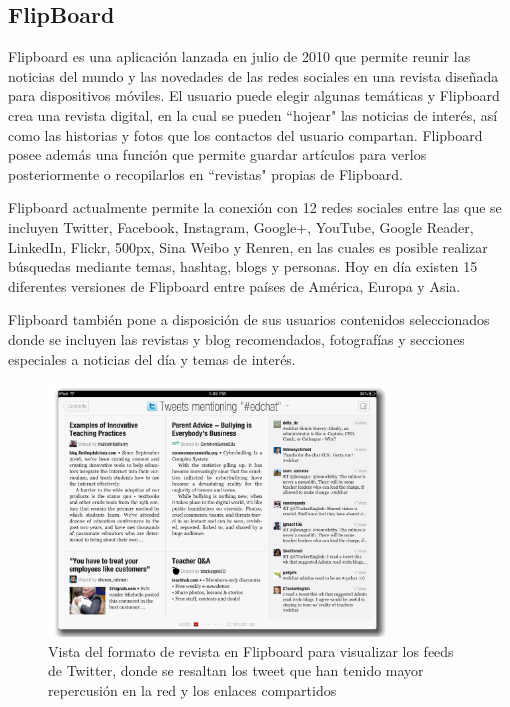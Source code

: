 \subsection{FlipBoard}

Flipboard \cite{flipboard} es una aplicación lanzada en julio de 2010 que permite reunir las noticias del mundo y las novedades de las redes sociales en una revista diseñada para dispositivos móviles. El usuario puede elegir algunas temáticas y Flipboard crea una revista digital, en la cual se pueden ``hojear" las noticias de interés, así como las historias y fotos que los contactos del usuario compartan. Flipboard posee además una función que permite guardar artículos para verlos posteriormente o recopilarlos en ``revistas" propias de Flipboard.


Flipboard actualmente permite la conexión con 12 redes sociales entre las que se incluyen Twitter, Facebook, Instagram, Google+, YouTube, Google Reader, LinkedIn, Flickr, 500px, Sina Weibo y Renren, en las cuales es posible realizar búsquedas mediante temas, hashtag, blogs y personas. Hoy en día existen 15 diferentes versiones de Flipboard entre países de América, Europa y Asia.

Flipboard también pone a disposición de sus usuarios contenidos seleccionados donde se incluyen las revistas y blog recomendados, fotografías y secciones especiales a noticias del día y temas de interés.

\begin{figure}[H]
	\centering
	\includegraphics[width=0.8\textwidth]{imgs/flipboard3.PNG}
	\caption{Vista del formato de revista en Flipboard para visualizar los feeds de Twitter, donde se resaltan los tweet que han tenido mayor repercusión en la red y los enlaces compartidos}
	\label{fig:flipboard1}
\end{figure}


